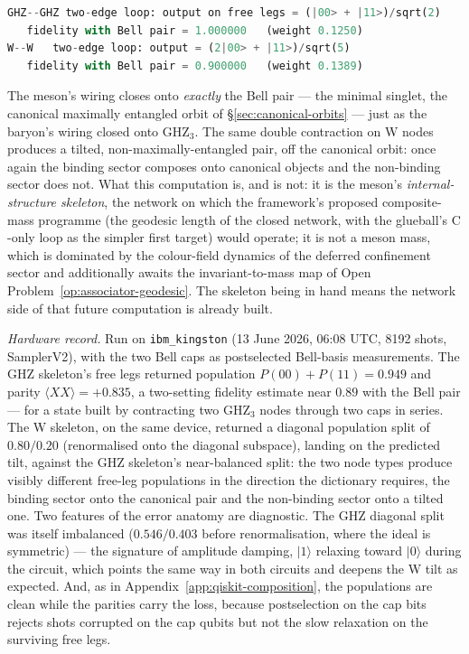 \begin{lstlisting}[language=Python,basicstyle=\small\ttfamily]
GHZ--GHZ two-edge loop: output on free legs = (|00> + |11>)/sqrt(2)
   fidelity with Bell pair = 1.000000   (weight 0.1250)
W--W   two-edge loop: output = (2|00> + |11>)/sqrt(5)
   fidelity with Bell pair = 0.900000   (weight 0.1389)
\end{lstlisting}

The meson's wiring closes onto \emph{exactly} the Bell pair --- the minimal singlet, the canonical
maximally entangled orbit of \S\ref{sec:canonical-orbits} --- just as the baryon's wiring closed
onto $\mathrm{GHZ}_3$. The same double contraction on W nodes produces a tilted,
non-maximally-entangled pair, off the canonical orbit: once again the binding sector composes onto
canonical objects and the non-binding sector does not. What this computation is, and is not: it is
the meson's \emph{internal-structure skeleton}, the network on which the framework's proposed
composite-mass programme (the geodesic length of the closed network, with the glueball's
$\mathrm{C}$-only loop as the simpler first target) would operate; it is not a meson mass, which is
dominated by the colour-field dynamics of the deferred confinement sector and additionally awaits
the invariant-to-mass map of Open Problem~\ref{op:associator-geodesic}. The skeleton being in hand
means the network side of that future computation is already built.

\emph{Hardware record.} Run on \texttt{ibm\_kingston} (13 June 2026, 06:08 UTC, 8192 shots,
SamplerV2), with the two Bell caps as postselected Bell-basis measurements. The GHZ skeleton's free
legs returned population $P(00)+P(11) = 0.949$ and parity $\langle XX\rangle = +0.835$, a
two-setting fidelity estimate near $0.89$ with the Bell pair --- for a state built by contracting
two GHZ$_3$ nodes through two caps in series. The W skeleton, on the same device, returned a
diagonal population split of $0.80/0.20$ (renormalised onto the diagonal subspace), landing on the
predicted tilt, against the GHZ skeleton's near-balanced split: the two node types produce visibly
different free-leg populations in the direction the dictionary requires, the binding sector onto the
canonical pair and the non-binding sector onto a tilted one. Two features of the error anatomy are
diagnostic. The GHZ diagonal split was itself imbalanced ($0.546/0.403$ before renormalisation,
where the ideal is symmetric) --- the signature of amplitude damping, $\lvert1\rangle$ relaxing
toward $\lvert0\rangle$ during the circuit, which points the same way in both circuits and deepens
the W tilt as expected. And, as in Appendix~\ref{app:qiskit-composition}, the populations are clean
while the parities carry the loss, because postselection on the cap bits rejects shots corrupted on
the cap qubits but not the slow relaxation on the surviving free legs.

